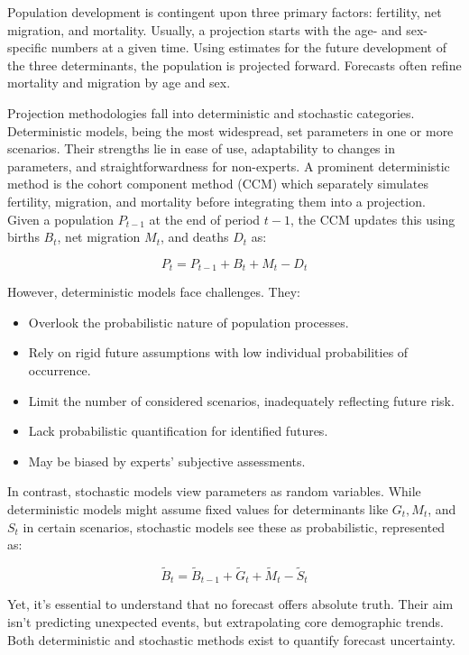 Population development is contingent upon three primary factors: fertility, net
migration, and mortality. Usually, a projection starts with the age- and
sex-specific numbers at a given time. Using estimates for the future
development of the three determinants, the population is projected forward.
Forecasts often refine mortality and migration by age and sex.

Projection methodologies fall into deterministic and stochastic categories.
Deterministic models, being the most widespread, set parameters in one or more
scenarios. Their strengths lie in ease of use, adaptability to changes in
parameters, and straightforwardness for non-experts. A prominent deterministic
method is the cohort component method (CCM) which separately simulates
fertility, migration, and mortality before integrating them into a projection.
Given a population \(P_{t-1}\) at the end of period \(t-1\), the CCM updates
this using births \(B_t\), net migration \(M_t\), and deaths \(D_t\) as:

\[ P_t = P_{t-1} + B_t + M_t - D_t \]

However, deterministic models face challenges. They:
\begin{itemize}
      \item Overlook the probabilistic nature of population processes.
      \item Rely on rigid future assumptions with low individual probabilities of
            occurrence.
      \item Limit the number of considered scenarios, inadequately reflecting future risk.
      \item Lack probabilistic quantification for identified futures.
      \item May be biased by experts' subjective assessments.
\end{itemize}

In contrast, stochastic models view parameters as random variables. While
deterministic models might assume fixed values for determinants like \(G_t,
M_t\), and \(S_t\) in certain scenarios, stochastic models see these as
probabilistic, represented as:

\[ \tilde{B}_t = \tilde{B}_{t-1} + \tilde{G}_t + \tilde{M}_t - \tilde{S}_t \]

Yet, it's essential to understand that no forecast offers absolute truth. Their
aim isn't predicting unexpected events, but extrapolating core demographic
trends. Both deterministic and stochastic methods exist to quantify forecast
uncertainty.

